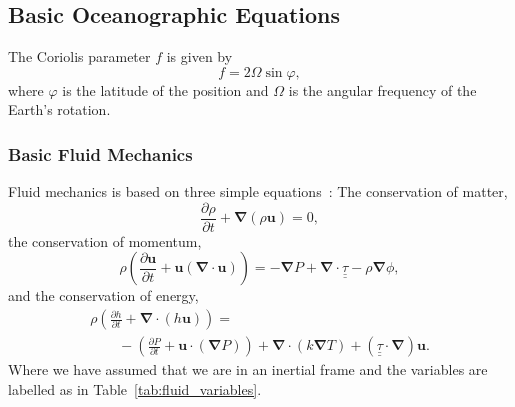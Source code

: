 \subsection{Basic Oceanographic Equations}

The Coriolis parameter $f$ is given by
\begin{equation}
f=2 \Omega \sin \varphi,
\label{eq:coriolis}
\end{equation}
where $\varphi$ is the latitude of the position and $\Omega$ is the angular
 frequency of the Earth's rotation.

\subsubsection{Basic Fluid Mechanics}
Fluid mechanics is based on three simple equations~\cite{landau1959course}:
 The conservation of matter,
\begin{equation}
\frac{\partial \rho}{\partial t} + \boldsymbol{\nabla}(\rho \boldsymbol{u}) = 0,
\tag{Matter}
\label{eq:Matter}
\end{equation}
the conservation of momentum,
\begin{equation}
\rho\left (\frac{\partial \mathbf{u}}{\partial t}
+ \mathbf{u}(\boldsymbol{\nabla}\cdot \mathbf{u})\right) =
- \boldsymbol{\nabla}P + \boldsymbol{\nabla}\cdot \underline{\underline{\tau}}
- \rho\boldsymbol{\nabla}\phi,
\tag{Momentum}
\end{equation}
and the conservation of energy,
\begin{equation}
\begin{array}{l}
\rho \left( \frac{\partial h}{\partial t} + \boldsymbol{\nabla}
\cdot (h\mathbf{u})\right) = \\ \quad\quad- \left( \frac{\partial P}{\partial t}
+ \mathbf{u}\cdot (\boldsymbol{\nabla} P) \right)
+ \boldsymbol{\nabla}\cdot (k \boldsymbol{\nabla} T )
+ (\underline{\underline{\tau}}\cdot\boldsymbol{\nabla})\mathbf{u}.\end{array}
\tag{Energy}
\end{equation}
Where we have assumed that we are in an inertial frame and the variables are
labelled as in Table~\ref{tab:fluid_variables}.



